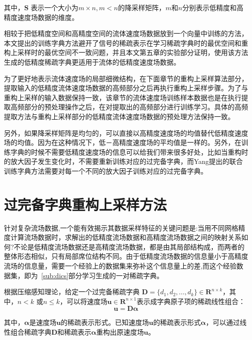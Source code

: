 其中，$\boldsymbol S$ 表示一个大小为$m \times n, m < n $的降采样矩阵，$m$和$n$分别表示低精度和高精度速度场数据的维度。

相较于把低精度空间和高精度空间的流体速度场数据放到一个向量中训练的方法，本文提出的训练字典方法避开了信号的稀疏表示在学习稀疏字典时的最优空间和重构上采样时的最优空间不一致问题，并且本文第五章的实验部分证明，使用该方法生成的低精度稀疏字典更适用于流体的低精度速度场数据。
 
 为了更好地表示流体速度场的局部细微结构，在下面章节的重构上采样算法部分，提取输入的低精度流体速度场数据的高频部分之后再执行重构上采样步骤。为了与重构上采样的输入数据保持一致，该章节的流体速度场训练样本数据也是在执行提取高频部分的预处理操作之后，在对提取出的高频部分进行训练学习。具体的高频提取方法与重构上采样部分的低精度流体速度场数据的预处理方法保持一致。

另外，如果降采样矩阵是均匀的，可以直接以高精度速度场的均值替代低精度速度场的均值。因为在这种情况下，低－高精度速度场的平均值是一样的。另外，在训练字典的时候不需要低精度速度场的信息可以给我们带来很多好处，比如当重构时的放大因子发生变化时，不需要重新训练对应的过完备字典，而Yang提出的联合训练字典方法需要对每一个不同的放大因子训练对应的过完备字典。

\section{过完备字典重构上采样方法}

针对复杂流场数据,一个能有效揭示其数据采样特征的关键问题是:当用不同网格精度计算流场数据时，求解出的低精度流场数据和高精度流场数据之间的映射关系如何?不论是低精度流场数据还是高精度流场数据，都是由其局部结构成，而两者的整体形态相似，只有局部席位结构不同。由于低精度流场数据的信息量小于高精度流场的信息量，需要一个经验上的数据集来弥补这个信息量上的差,而这个经验数据集，即为~\ref{sub:dics}部分学习生成的一对稀疏字典。

根据压缩感知理论，给定一个过完备稀疏字典 $\boldsymbol D = \{d_1, d_2,...,d_k\} \in \boldsymbol R^{n \times k}$，其中，$n < k$ 或$n \leq k$，可以将速度场$\boldsymbol u \in \boldsymbol R^{n \times 1}$表示成字典原子项的稀疏线性组合：
\begin{equation}
\label{eq:dalpha}
\boldsymbol u = \boldsymbol {D \alpha}
\end{equation}

其中，$\boldsymbol \alpha$是速度场$\boldsymbol u$的稀疏表示形式。已知速度场$\boldsymbol u$的稀疏表示形式$\boldsymbol \alpha$，可以通过线性组合稀疏字典$\boldsymbol D$和稀疏表示$\boldsymbol \alpha$重构出原速度场$\boldsymbol u$。


